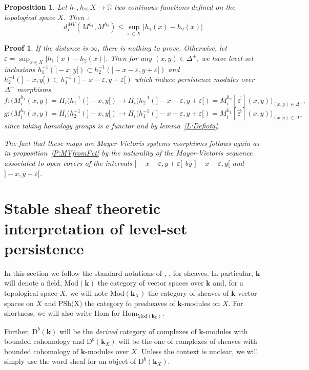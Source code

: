 \documentclass[a4paper, english, 11pt]{article}
\newcommand{\kk}[0]{\textbf{k}}
\newcommand{\Mod}[0]{\text{Mod}}
\newcommand{\0}{\vec{0}}
\newcommand{\R}[0]{\mathbb{R}}
\newcommand{\D}[0]{\text{D}}
\newcommand{\Hom}[0]{\text{Hom}}
\newtheorem{prop}{Proposition}[section]
\newtheorem*{pf}{Proof} }
\begin{document}
\begin{prop}\label{P:StabilityfordMV}
Let $h_1,h_2 : X \to \R$ two continous functions defined on the topological space $X$. Then : $$d_I^{MV}(M^{h_1},M^{h_2})\leq \sup_{x\in X} |h_1(x)-h_2(x)| $$

\end{prop}
\begin{pf} If the distance is $\infty$, there is nothing to prove. Otherwise, let $\varepsilon= \sup_{x\in X} |h_1(x)-h_2(x)|$. Then for any $(x,y)\in \Delta^{+}$, we have  level-set inclusions  $h^{-1}_1(]-x,y[) \subset h^{-1}_2(]-x-\varepsilon, y+\varepsilon[)$ and  $h^{-1}_2(]-x,y[) \subset h^{-1}_1(]-x-\varepsilon, y+\varepsilon[)$ which induce persistence modules over $\Delta^+$ morphisms 
$$f:\big(M_i^{h_1}(x,y)=H_i(h_1^{-1}(]-x,y[) \to H_i(h_2^{-1}(]-x-\varepsilon,y+\varepsilon[)= M_i^{h_2}[\vec{\varepsilon}](x,y)\big)_{(x,y)\in \Delta^+},  $$ 
$$g:\big(M_i^{h_2}(x,y)=H_i(h_2^{-1}(]-x,y[) \to H_i(h_1^{-1}(]-x-\varepsilon,y+\varepsilon[)= M_i^{h_1}[\vec{\varepsilon}](x,y)\big)_{(x,y)\in \Delta^+} $$ since 
taking homology groups is a functor and by lemma~\ref{L:Defiota}. 

The fact that these maps are Mayer-Vietoris systems morphisms follows again as in proposition~\ref{P:MVfromFct} by the naturality of the Mayer-Vietoris sequence associated to open covers of the intervals $]-x-\varepsilon, y+\varepsilon[$ by $]-x-\varepsilon, y[$ and $]-x, y+\varepsilon[$.
\end{pf}


\section{Stable sheaf theoretic interpretation of level-set persistence}
In this section we follow the standard notations of \cite{Kash90}, \cite{KS18}, \cite{Berk18} for sheaves. 
In particular,  $\kk$ will denote a field, $\Mod(\kk)$ the category of vector spaces over $\kk$ and, for   a topological space $X$,  we will note $\Mod(\kk_X)$ the category of sheaves of $\kk$-vector spaces on $X$ and $\text{PSh(X)}$ the category fo presheaves of $\kk$-modules on $X$. For shortness, we will also write $\Hom$ for $\Hom_{\Mod(\kk_\R)}$.

Further, $\D^b(\kk)$ will be the \emph{derived} category of complexes of $\kk$-modules with bounded cohomology and $\D^b(\kk_X)$ will be the one of complexes of sheaves with bounded cohomology of $\kk$-modules over $X$. 
 Unless the context is unclear, we will simply use the word  sheaf for an object of $\D^b(\kk_X)$. 
 
\end{document}
